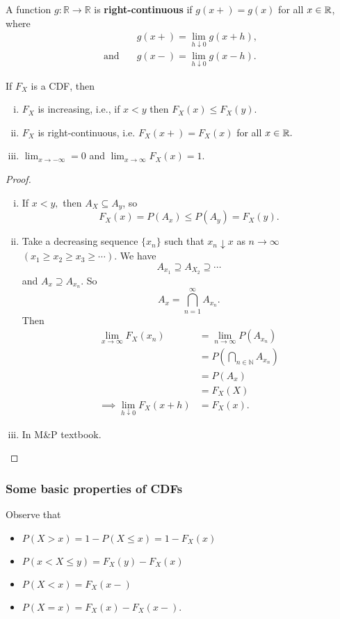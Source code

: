 \begin{definition}
A function $g:\mathbb R\to \mathbb R$ is \textbf{right-continuous} if $g(x+)=g(x)$ for all $x\in \mathbb R$, where
\begin{align*}
     &g(x+)=\lim_{h\downarrow 0}g(x+h), \\
    \text{and} \quad &g(x-)=\lim_{h\downarrow 0}g(x-h).
\end{align*}
\end{definition}

\begin{prop}
If $F_X$ is a CDF, then 
\begin{enumerate}[i.]
    \item $F_X$ is increasing, i.e., if $x<y$ then $F_X(x)\leq F_X(y).$
    \item $F_X$ is right-continuous, i.e. $F_X(x+)=F_X(x)$ for all $x\in \mathbb R.$
    \item $\lim_{x\to -\infty}=0$ and $\lim_{x\to \infty} F_X(x)=1$.
\end{enumerate}
\end{prop}

\begin{proof}
\begin{enumerate}[i.]
\item
If $x<y,$ then $A_X\subseteq A_y$, so
$$
F_X(x)=P(A_x)\leq P(A_y)=F_X(y).
$$
\item
Take a decreasing sequence $\{x_n\}$ such that $x_n\downarrow x$ as $n\to \infty$ $(x_1\geq x_2\geq x_3\geq \cdots).$ We have
$$
A_{x_1}\supseteq A_{X_2} \supseteq \cdots
$$
and $A_x\supseteq A_{x_n}$. So 
$$
A_x=\bigcap^\infty_{n=1}A_{x_n}.
$$
Then
\begin{align*}
    \lim_{x\to \infty} F_X(x_n)&=\lim_{n\to \infty}P(A_{x_n})\\
    &=P\left(\bigcap_{n\in\mathbb N}A_{x_n}\right)\\
    &=P(A_x) \\
    &=F_X(X) \\
	\implies \lim_{h\downarrow 0} F_X(x+h)&=F_X(x).
\end{align*}

\item In M\&P textbook.
\end{enumerate}

\end{proof}
\subsubsection{Some basic properties of CDFs}
Observe that
\begin{itemize}
    \item $P(X>x)=1-P(X\leq x)=1-F_X(x)$
    \item $P(x<X\leq y)=F_X(y)-F_X(x)$
    \item $P(X<x)=F_X(x-)$
    \item $P(X=x)=F_X(x)-F_X(x-).$
\end{itemize}
